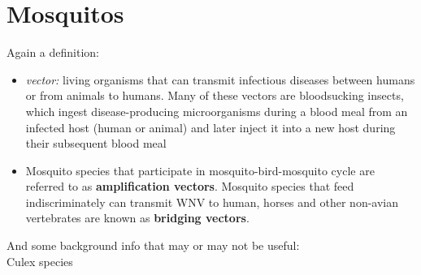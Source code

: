 \documentclass[a4, 12pt]{article}
\begin{document}
\section{Mosquitos}
Again a definition:
\begin{itemize}
\item \emph{vector:} living organisms that can transmit infectious diseases between humans or from animals to humans. Many of these vectors are bloodsucking insects, which ingest disease-producing microorganisms during a blood meal from an infected host (human or animal) and later inject it into a new host during their subsequent blood meal
\item Mosquito species that participate in mosquito-bird-mosquito cycle are referred to as \textbf{amplification vectors}. Mosquito species that feed indiscriminately can transmit WNV to human, horses and other non-avian vertebrates are known as \textbf{bridging vectors}.
\end{itemize}
And some background info that may or may not be useful:\\
Culex species
\end{document}
